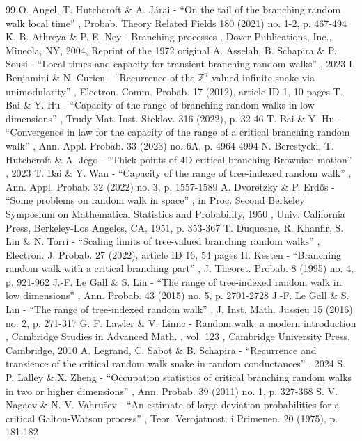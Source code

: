 \documentclass[11pt]{article}
\numberwithin{equation}{section}
\theoremstyle{plain}
\theoremstyle{definition}
\newcommand{\1}{{\text{\Large $\mathfrak 1$}}}
\begin{document}
\begin{thebibliography}{99}
 O. Angel, T. Hutchcroft \& A. Járai - “On the tail of the branching random walk local time” , Probab. Theory Related Fields 180 (2021) no. 1-2, p. 467-494
 K. B. Athreya \& P. E. Ney - Branching processes , Dover Publications, Inc., Mineola, NY, 2004, Reprint of the 1972 original
 A. Asselah, B. Schapira \& P. Sousi - “Local times and capacity for transient branching random walks” , 2023
 I. Benjamini \& N. Curien - “Recurrence of the $\mathbb{Z}^d$-valued infinite snake via unimodularity” , Electron. Comm. Probab. 17 (2012), article ID 1, 10 pages
 T. Bai \& Y. Hu - “Capacity of the range of branching random walks in low dimensions” , Trudy Mat. Inst. Steklov. 316 (2022), p. 32-46
 T. Bai \& Y. Hu - “Convergence in law for the capacity of the range of a critical branching random walk” , Ann. Appl. Probab. 33 (2023) no. 6A, p. 4964-4994
 N. Berestycki, T. Hutchcroft \& A. Jego - “Thick points of 4D critical branching Brownian motion” , 2023
 T. Bai \& Y. Wan - “Capacity of the range of tree-indexed random walk” , Ann. Appl. Probab. 32 (2022) no. 3, p. 1557-1589
 A. Dvoretzky \& P. Erdős - “Some problems on random walk in space” , in Proc. Second Berkeley Symposium on Mathematical Statistics and Probability, 1950 , Univ. California Press, Berkeley-Los Angeles, CA, 1951, p. 353-367
 T. Duquesne, R. Khanfir, S. Lin \& N. Torri - “Scaling limits of tree-valued branching random walks” , Electron. J. Probab. 27 (2022), article ID 16, 54 pages
 H. Kesten - “Branching random walk with a critical branching part” , J. Theoret. Probab. 8 (1995) no. 4, p. 921-962
 J.-F. Le Gall \& S. Lin - “The range of tree-indexed random walk in low dimensions” , Ann. Probab. 43 (2015) no. 5, p. 2701-2728
 J.-F. Le Gall \& S. Lin - “The range of tree-indexed random walk” , J. Inst. Math. Jussieu 15 (2016) no. 2, p. 271-317
 G. F. Lawler \& V. Limic - Random walk: a modern introduction , Cambridge Studies in Advanced Math. , vol. 123 , Cambridge University Press, Cambridge, 2010
 A. Legrand, C. Sabot \& B. Schapira - “Recurrence and transience of the critical random walk snake in random conductances” , 2024
 S. P. Lalley \& X. Zheng - “Occupation statistics of critical branching random walks in two or higher dimensions” , Ann. Probab. 39 (2011) no. 1, p. 327-368
 S. V. Nagaev \& N. V. Vahrušev - “An estimate of large deviation probabilities for a critical Galton-Watson process” , Teor. Verojatnost. i Primenen. 20 (1975), p. 181-182

\end{thebibliography}
\end{document}

